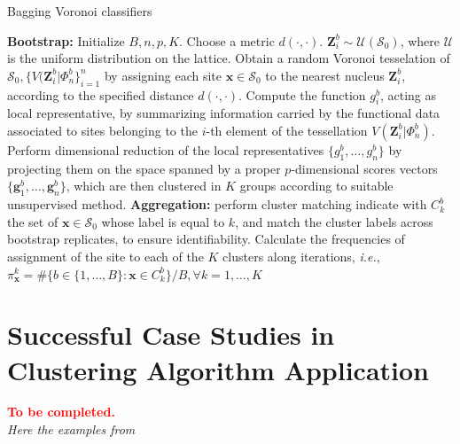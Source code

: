 \begin{algorithm}[H]
    \caption{Bagging Voronoi classifiers}
    \label{alg:bvc}
    \begin{algorithmic}[1]
    \STATE \textbf{Bootstrap:}
    \STATE Initialize $B, n, p, K$. Choose a metric $d(\cdot,\cdot).$
    \STATE $\mathbf{Z}_i^b\sim\mathcal{U}(\mathcal{S}_0)$, where $\mathcal{U}$ is the uniform distribution on the lattice. Obtain a random Voronoi tesselation of $\mathcal{S}_0, \{V(\mathbf{Z}_i^b|\Phi_n^b\}^n_{i=1}$ by assigning each site $\mathbf{x}\in \mathcal{S}_0$ to the nearest nucleus $\mathbf{Z}_i^b$, according to the specified distance $d(\cdot,\cdot).$
    \ENDFOR
    \STATE Compute the function $g_i^b$, acting as local representative, by summarizing information carried by the functional data associated to sites belonging to the $i$-th element of the tessellation $V(\mathbf{Z}_i^b|\Phi_n^b)$.
    \ENDFOR
    \STATE Perform dimensional reduction of the local representatives $\{g_1^b,\dots, g_n^b\}$ by projecting them on the space spanned by a proper $p$-dimensional scores vectors $\{\mathbf{g}_1^b,\dots, \mathbf{g}_n^b\}$, which are then clustered in $K$ groups according to suitable unsupervised method.
    \ENDFOR
    \STATE \textbf{Aggregation:} perform cluster matching
    \STATE indicate with $C_k^b$ the set of $\mathbf{x} \in \mathcal{S}_0$ whose label is equal to $k$, and match the cluster labels across bootstrap replicates, to ensure identifiability.
    \ENDFOR
    \ENDFOR
    \STATE Calculate the frequencies of assignment of the site to each of the $K$ clusters along iterations, \textit{i.e.}, $\pi_{\mathbf{x}}^k=\#\{b\in\{1,\dots,B\}:\mathbf{x}\in C_k^b\}/B, \forall k=1,\dots,K$
    \ENDFOR
    \end{algorithmic}
\end{algorithm} 



\section{Successful Case Studies in Clustering Algorithm Application}
\label{sec:bcv-cases}
\textbf{\textcolor{red}{To be completed.}}
\\
\textit{Here the examples from \cite{s}}
